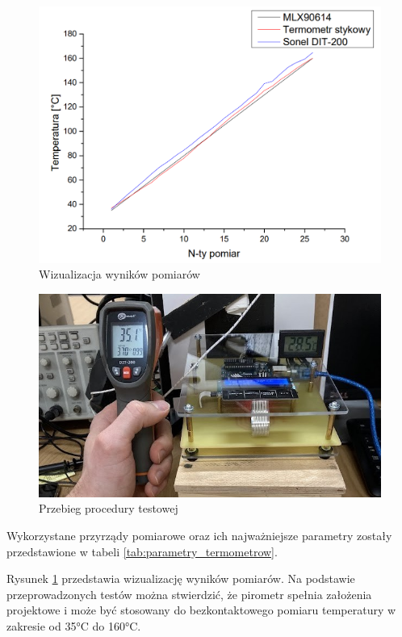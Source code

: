    \begin{figure}[h!]
        \centering
        \includegraphics[width=1.05\textwidth]{images/wykres.png}
        \caption{Wizualizacja wyników pomiarów}
        \label{fig:origin}
    \end{figure}

\begin{figure}[h!]
    \centering
    \includegraphics[width=1.05\textwidth]{images/test.jpg}
    \caption{Przebieg procedury testowej}
    \label{fig:pomiar}
\end{figure}

Wykorzystane przyrządy pomiarowe oraz ich najważniejsze parametry zostały przedstawione w tabeli \ref{tab:parametry_termometrow}.

\vspace{12pt}

Rysunek \ref{fig:origin} przedstawia wizualizację wyników pomiarów. Na podstawie przeprowadzonych testów można stwierdzić, że pirometr spełnia założenia projektowe i może być stosowany do bezkontaktowego pomiaru temperatury w zakresie od 35°C do 160°C.

